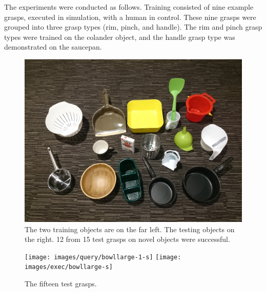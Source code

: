 The experiments were conducted as follows. Training consisted of nine example grasps, executed in simulation, with a human in control. These nine grasps were grouped into three grasp types (rim, pinch, and handle). The rim and pinch grasp types were trained on the colander object, and the handle grasp type was demonstrated on the saucepan.

\begin{figure}
 \includegraphics[width=0.9\columnwidth]{images/object_set}
 \caption{The two training objects are on the far left. The testing objects on the right. 12 from 15 test grasps on novel objects were successful.}
 \label{fig:test}
\end{figure}

\begin{figure}
\newcommand{\w}{0.18\linewidth}
 \texttt{[image: images/query/bowllarge-1-s]}
  \texttt{[image: images/exec/bowllarge-s]}
 \caption{The fifteen test grasps.}
 \label{fig:test}
\end{figure}
